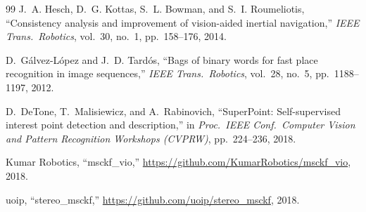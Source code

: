 \documentclass[conference]{IEEEtran}
\begin{document}
\begin{thebibliography}{99}
J.~A. Hesch, D.~G. Kottas, S.~L. Bowman, and S.~I. Roumeliotis, ``Consistency analysis and improvement of vision-aided inertial navigation,'' \emph{IEEE Trans.\ Robotics}, vol.~30, no.~1, pp.~158--176, 2014.

D.~G{\'a}lvez-L{\'o}pez and J.~D. Tard{\'o}s, ``Bags of binary words for fast place recognition in image sequences,'' \emph{IEEE Trans.\ Robotics}, vol.~28, no.~5, pp.~1188--1197, 2012.

D.~DeTone, T.~Malisiewicz, and A.~Rabinovich, ``SuperPoint: Self-supervised interest point detection and description,'' in \emph{Proc.\ IEEE Conf.\ Computer Vision and Pattern Recognition Workshops (CVPRW)}, pp.~224--236, 2018.

Kumar Robotics, ``msckf\_vio,'' \url{https://github.com/KumarRobotics/msckf_vio}, 2018.

uoip, ``stereo\_msckf,'' \url{https://github.com/uoip/stereo_msckf}, 2018.

\end{thebibliography}
\end{document}
